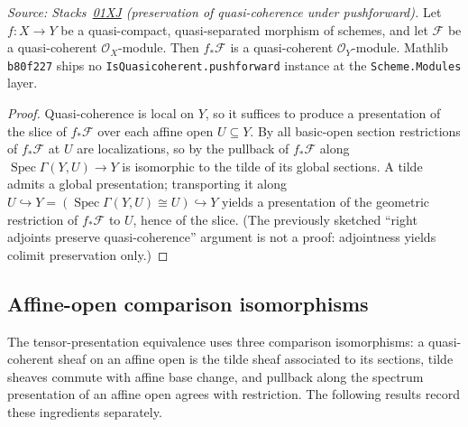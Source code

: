 \begin{lemma}
  \label{lem:pushforward_isQuasicoherent}
  \leanok
  \textit{Source: Stacks~\href{https://stacks.math.columbia.edu/tag/01XJ}{01XJ}
  (preservation of quasi-coherence under pushforward).}
  Let \(f : X \to Y\) be a quasi-compact, quasi-separated morphism of
  schemes, and let \(\mathcal{F}\) be a quasi-coherent
  \(\mathcal{O}_X\)-module. Then \(f_* \mathcal{F}\) is a quasi-coherent
  \(\mathcal{O}_Y\)-module. Mathlib \texttt{b80f227} ships no
  \texttt{IsQuasicoherent.pushforward} instance at the
  \texttt{Scheme.Modules} layer.
\end{lemma}
\begin{proof}
  \leanok
  Quasi-coherence is local on $Y$, so it suffices to produce a presentation
  of the slice of $f_* \mathcal{F}$ over each affine open $U \subseteq Y$.
  By  all basic-open section
  restrictions of $f_* \mathcal{F}$ at $U$ are localizations, so by
   the pullback of
  $f_* \mathcal{F}$ along $\operatorname{Spec} \Gamma(Y, U) \to Y$ is
  isomorphic to the tilde of its global sections. A tilde admits a global
  presentation; transporting it along
  $U \hookrightarrow Y = (\operatorname{Spec}\Gamma(Y,U) \cong U)
  \hookrightarrow Y$ yields a presentation of the geometric restriction of
  $f_* \mathcal{F}$ to $U$, hence of the slice. (The previously sketched
  ``right adjoints preserve quasi-coherence'' argument is not a proof:
  adjointness yields colimit preservation only.)
\end{proof}

\subsection{Affine-open comparison isomorphisms}
\label{sec:quot_iter189_unbundle}

The tensor-presentation equivalence uses three comparison isomorphisms:
a quasi-coherent sheaf on an affine open is the tilde sheaf associated to
its sections, tilde sheaves commute with affine base change, and pullback
along the spectrum presentation of an affine open agrees with restriction.
The following results record these ingredients separately.

